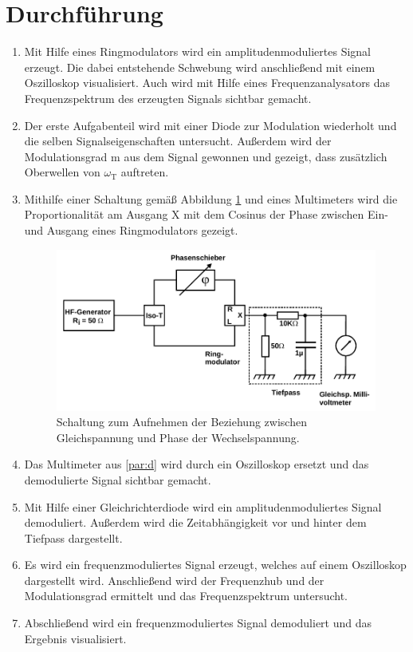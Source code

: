 \section{Durchf\"{u}hrung}
\begin{enumerate}
\item
\label{par:a}
Mit Hilfe eines Ringmodulators wird ein amplitudenmoduliertes Signal erzeugt. Die dabei entstehende Schwebung wird anschließend mit einem
Oszilloskop visualisiert. Auch wird mit Hilfe eines Frequenzanalysators das Frequenzspektrum des erzeugten Signals sichtbar gemacht.

\item
\label{par:b}
Der erste Aufgabenteil wird mit einer Diode zur Modulation wiederholt und die selben Signalseigenschaften untersucht.
Außerdem wird der Modulationsgrad m aus dem Signal gewonnen und gezeigt, dass zusätzlich Oberwellen von $\omega_\text{T}$ auftreten.

\item
\label{par:c}
Mithilfe einer Schaltung gemäß Abbildung \ref{Abb14} und eines Multimeters wird die Proportionalität am Ausgang X mit dem Cosinus der Phase zwischen
Ein- und Ausgang eines Ringmodulators gezeigt.

\begin{figure}
	\centering
	\includegraphics[width=\textwidth]{img/Abb14.pdf}
	\caption{Schaltung zum Aufnehmen der Beziehung zwischen Gleichspannung und Phase der Wechselspannung. \cite{FP}}
	\label{Abb14}
\end{figure}

\item
\label{par:d}
Das Multimeter aus \ref{par:d} wird durch ein Oszilloskop ersetzt und das demodulierte Signal sichtbar gemacht.

\item
\label{par:e}
Mit Hilfe einer Gleichrichterdiode wird ein amplitudenmoduliertes Signal demoduliert.
Außerdem wird die Zeitabhängigkeit vor und hinter dem Tiefpass dargestellt.

\item
\label{par:f}
Es wird ein frequenzmoduliertes Signal erzeugt, welches auf einem Oszilloskop dargestellt wird. Anschließend wird der Frequenzhub und
der Modulationsgrad ermittelt und das Frequenzspektrum untersucht.

\item
\label{par:g}
Abschließend wird ein frequenzmoduliertes Signal demoduliert und das Ergebnis visualisiert.
\end{enumerate}
